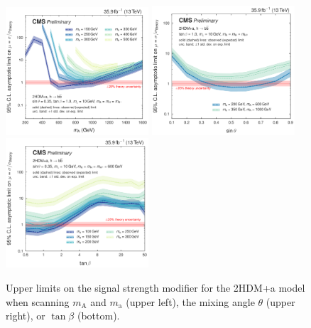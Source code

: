 \begin{figure}[htbp]
  \centering
  \includegraphics[width=0.475\textwidth]{figures/limits/limits_2hdma_mass_prelim.pdf}
  \includegraphics[width=0.475\textwidth]{figures/limits/limits_2hdma_sinp_prelim.pdf}\\
  \includegraphics[width=0.475\textwidth]{figures/limits/limits_2hdma_tanb_prelim.pdf}\\
  \caption{Upper limits on the signal strength modifier for the 2HDM+a model when scanning $m_\text{A}$ and $m_\text{a}$ (upper left), the mixing angle $\theta$ (upper right), or $\tan\beta$ (bottom).}
  \label{fig:limits_2hdma}
\end{figure}


